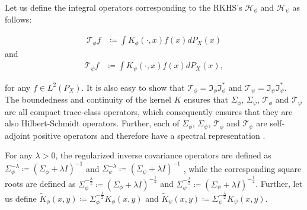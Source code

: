 \documentclass{article}
\theoremstyle{plain}
\newcommand{\repone}{\phi}
\newcommand{\reptwo}{\psi}
\newcommand{\Hone}{\mathcal{H}_{\phi}}
\newcommand{\Htwo}{\mathcal{H}_{\psi}}
\newcommand{\LPtwo}{L^{2}(P_{X})}
\begin{document}
Let us define the integral operators corresponding to the RKHS's $\Hone$ and $\Htwo$ as follows:


\[
\begin{aligned}
    \mathcal{T}_{\repone} f &\coloneq \int K_{\repone}(\cdot,x) f(x) dP_{X}(x)
\end{aligned}
\]
and 
\[
\begin{aligned}
    \mathcal{T}_{\reptwo} f &\coloneq \int K_{\reptwo}(\cdot,x) f(x) dP_{X}(x),
\end{aligned}
\]

for any $f \in \LPtwo$.
It is also easy to show that $\mathcal{T}_{\repone} = \mathfrak{I}_{\repone}\mathfrak{I}_{\repone}^{*}$ and $\mathcal{T}_{\reptwo} = \mathfrak{I}_{\reptwo}\mathfrak{I}_{\reptwo} ^{*}$. The boundedness and continuity of the kernel $K$ ensures that $\Sigma_{\repone}$, $\Sigma_{\reptwo}$, $\mathcal{T}_{\repone}$ and $\mathcal{T}_{\reptwo}$ are all compact trace-class operators, which consequently ensures that they are also Hilbert-Schmidt operators. Further, each of $\Sigma_{\repone}$, $\Sigma_{\reptwo}$, $\mathcal{T}_{\repone}$ and $\mathcal{T}_{\reptwo}$ are self-adjoint positive operators and therefore have a spectral representation \citep[Theorems~VI.16,VI.17]{reed1980methods}.

For any $\lambda>0$, the regularized inverse covariance operators are defined as $\Sigma_{\repone}^{-\lambda} \coloneq \left(\Sigma_{\repone} + \lambda I\right)^{-1}$ and $\Sigma_{\reptwo}^{-\lambda} \coloneq \left(\Sigma_{\reptwo} + \lambda I\right)^{-1}$ , while the corresponding square roots are defined as  $\Sigma_{\repone}^{-\frac{\lambda}{2}} \coloneq \left(\Sigma_{\repone} + \lambda I\right)^{-\frac{1}{2}}$ and $\Sigma_{\reptwo}^{-\frac{\lambda}{2}} \coloneq \left(\Sigma_{\reptwo} + \lambda I\right)^{-\frac{1}{2}}$. Further, let us  define $\widetilde{K}_{\repone}(x,y) \coloneq \Sigma_{\repone}^{-\frac{\lambda}{2}}K_{\repone}(x,y)$ and $\widetilde{K}_{\reptwo}(x,y)\coloneq \Sigma_{\reptwo}^{-\frac{\lambda}{2}}K_{\reptwo}(x,y)$.
\end{document}
